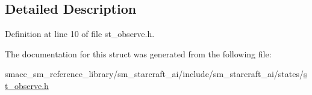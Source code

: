 \subsection{Detailed Description}


Definition at line 10 of file st\+\_\+observe.\+h.



The documentation for this struct was generated from the following file\+:\begin{DoxyCompactItemize}
\item 
smacc\+\_\+sm\+\_\+reference\+\_\+library/sm\+\_\+starcraft\+\_\+ai/include/sm\+\_\+starcraft\+\_\+ai/states/\hyperlink{sm__starcraft__ai_2include_2sm__starcraft__ai_2states_2st__observe_8h}{st\+\_\+observe.\+h}\end{DoxyCompactItemize}
